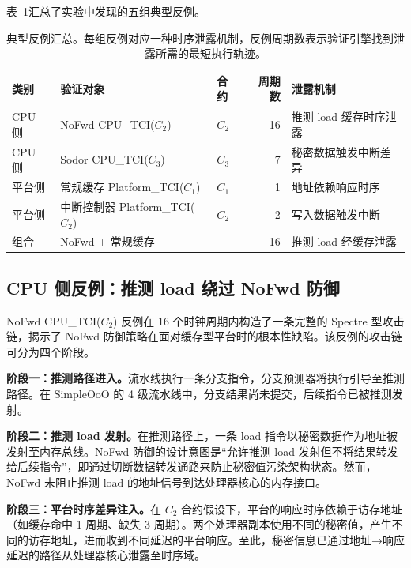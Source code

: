 表~\ref{tab:ch4_cex_summary}汇总了实验中发现的五组典型反例。

\begin{table}[htb]
    \centering
    \caption{典型反例汇总。每组反例对应一种时序泄露机制，反例周期数表示验证引擎找到泄露所需的最短执行轨迹。}
    \label{tab:ch4_cex_summary}
    \begin{tabular}{lllrl}
        \hline
        \textbf{类别} & \textbf{验证对象} & \textbf{合约} & \textbf{周期数} & \textbf{泄露机制} \\
        \hline
        CPU 侧 & NoFwd CPU\_TCI($C_2$) & $C_2$ & 16 & 推测 load 缓存时序泄露 \\
        CPU 侧 & Sodor CPU\_TCI($C_3$) & $C_3$ & 7 & 秘密数据触发中断差异 \\
        平台侧 & 常规缓存 Platform\_TCI($C_1$) & $C_1$ & 1 & 地址依赖响应时序 \\
        平台侧 & 中断控制器 Platform\_TCI($C_2$) & $C_2$ & 2 & 写入数据触发中断 \\
        组合 & NoFwd + 常规缓存 & — & 16 & 推测 load 经缓存泄露 \\
        \hline
    \end{tabular}
\end{table}

\subsection{CPU 侧反例：推测 load 绕过 NoFwd 防御}
\label{subsec:ch4_cex_nofwd}

NoFwd CPU\_TCI($C_2$) 反例在 16 个时钟周期内构造了一条完整的 Spectre 型攻击链，揭示了 NoFwd 防御策略在面对缓存型平台时的根本性缺陷。该反例的攻击链可分为四个阶段。

\textbf{阶段一：推测路径进入。}流水线执行一条分支指令，分支预测器将执行引导至推测路径。在 SimpleOoO 的 4 级流水线中，分支结果尚未提交，后续指令已被推测发射。

\textbf{阶段二：推测 load 发射。}在推测路径上，一条 load 指令以秘密数据作为地址被发射至内存总线。NoFwd 防御的设计意图是``允许推测 load 发射但不将结果转发给后续指令''，即通过切断数据转发通路来防止秘密值污染架构状态。然而，NoFwd 未阻止推测 load 的地址信号到达处理器核心的内存接口。

\textbf{阶段三：平台时序差异注入。}在 $C_2$ 合约假设下，平台的响应时序依赖于访存地址（如缓存命中 1 周期、缺失 3 周期）。两个处理器副本使用不同的秘密值，产生不同的访存地址，进而收到不同延迟的平台响应。至此，秘密信息已通过地址→响应延迟的路径从处理器核心泄露至时序域。

